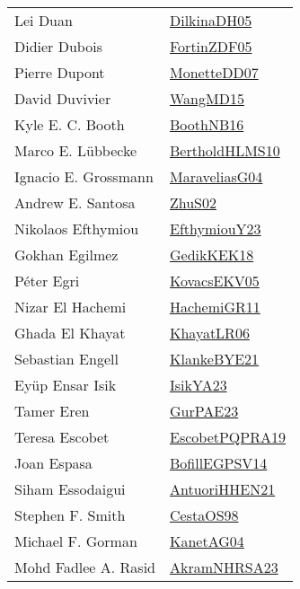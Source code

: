{\begin{longtable}{p{4cm}p{20cm}}
Lei Duan & \href{papers/DilkinaDH05.pdf}{DilkinaDH05}\cite{DilkinaDH05} \\
Didier Dubois & \href{papers/FortinZDF05.pdf}{FortinZDF05}\cite{FortinZDF05} \\
Pierre Dupont & \href{papers/MonetteDD07.pdf}{MonetteDD07}\cite{MonetteDD07} \\
David Duvivier & \href{articles/WangMD15.pdf}{WangMD15}\cite{WangMD15} \\
Kyle E. C. Booth & \href{papers/BoothNB16.pdf}{BoothNB16}\cite{BoothNB16} \\
Marco E. L{\"{u}}bbecke & \href{papers/BertholdHLMS10.pdf}{BertholdHLMS10}\cite{BertholdHLMS10} \\
Ignacio E. Grossmann & \href{papers/MaraveliasG04.pdf}{MaraveliasG04}\cite{MaraveliasG04} \\
Andrew E. Santosa & \href{papers/ZhuS02.pdf}{ZhuS02}\cite{ZhuS02} \\
Nikolaos Efthymiou & \href{papers/EfthymiouY23.pdf}{EfthymiouY23}\cite{EfthymiouY23} \\
Gokhan Egilmez & \href{articles/GedikKEK18.pdf}{GedikKEK18}\cite{GedikKEK18} \\
P{\'{e}}ter Egri & \href{papers/KovacsEKV05.pdf}{KovacsEKV05}\cite{KovacsEKV05} \\
Nizar El Hachemi & \href{articles/HachemiGR11.pdf}{HachemiGR11}\cite{HachemiGR11} \\
Ghada El Khayat & \href{articles/KhayatLR06.pdf}{KhayatLR06}\cite{KhayatLR06} \\
Sebastian Engell & \href{papers/KlankeBYE21.pdf}{KlankeBYE21}\cite{KlankeBYE21} \\
Ey{\"{u}}p Ensar Isik & \href{articles/IsikYA23.pdf}{IsikYA23}\cite{IsikYA23} \\
Tamer Eren & \href{articles/GurPAE23.pdf}{GurPAE23}\cite{GurPAE23} \\
Teresa Escobet & \href{articles/EscobetPQPRA19.pdf}{EscobetPQPRA19}\cite{EscobetPQPRA19} \\
Joan Espasa & \href{papers/BofillEGPSV14.pdf}{BofillEGPSV14}\cite{BofillEGPSV14} \\
Siham Essodaigui & \href{papers/AntuoriHHEN21.pdf}{AntuoriHHEN21}\cite{AntuoriHHEN21} \\
Stephen F. Smith & \href{papers/CestaOS98.pdf}{CestaOS98}\cite{CestaOS98} \\
Michael F. Gorman & \href{}{KanetAG04}\cite{KanetAG04} \\
Mohd Fadlee A. Rasid & \href{articles/AkramNHRSA23.pdf}{AkramNHRSA23}\cite{AkramNHRSA23} \\

\end{longtable}}

